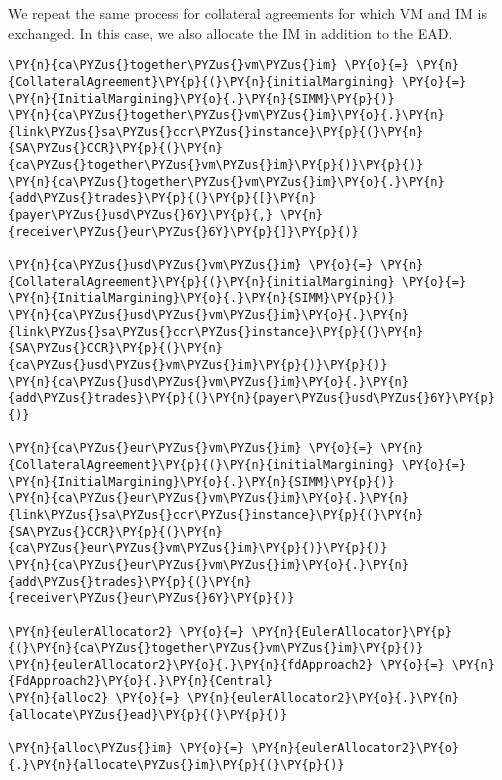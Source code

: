     We repeat the same process for collateral agreements for which VM and IM
is exchanged. In this case, we also allocate the IM in addition to the
EAD.

    \begin{tcolorbox}[breakable, size=fbox, boxrule=1pt, pad at break*=1mm,colback=cellbackground, colframe=cellborder]
\begin{Verbatim}[commandchars=\\\{\}]
\PY{n}{ca\PYZus{}together\PYZus{}vm\PYZus{}im} \PY{o}{=} \PY{n}{CollateralAgreement}\PY{p}{(}\PY{n}{initialMargining} \PY{o}{=} \PY{n}{InitialMargining}\PY{o}{.}\PY{n}{SIMM}\PY{p}{)}
\PY{n}{ca\PYZus{}together\PYZus{}vm\PYZus{}im}\PY{o}{.}\PY{n}{link\PYZus{}sa\PYZus{}ccr\PYZus{}instance}\PY{p}{(}\PY{n}{SA\PYZus{}CCR}\PY{p}{(}\PY{n}{ca\PYZus{}together\PYZus{}vm\PYZus{}im}\PY{p}{)}\PY{p}{)}
\PY{n}{ca\PYZus{}together\PYZus{}vm\PYZus{}im}\PY{o}{.}\PY{n}{add\PYZus{}trades}\PY{p}{(}\PY{p}{[}\PY{n}{payer\PYZus{}usd\PYZus{}6Y}\PY{p}{,} \PY{n}{receiver\PYZus{}eur\PYZus{}6Y}\PY{p}{]}\PY{p}{)}

\PY{n}{ca\PYZus{}usd\PYZus{}vm\PYZus{}im} \PY{o}{=} \PY{n}{CollateralAgreement}\PY{p}{(}\PY{n}{initialMargining} \PY{o}{=} \PY{n}{InitialMargining}\PY{o}{.}\PY{n}{SIMM}\PY{p}{)}
\PY{n}{ca\PYZus{}usd\PYZus{}vm\PYZus{}im}\PY{o}{.}\PY{n}{link\PYZus{}sa\PYZus{}ccr\PYZus{}instance}\PY{p}{(}\PY{n}{SA\PYZus{}CCR}\PY{p}{(}\PY{n}{ca\PYZus{}usd\PYZus{}vm\PYZus{}im}\PY{p}{)}\PY{p}{)}
\PY{n}{ca\PYZus{}usd\PYZus{}vm\PYZus{}im}\PY{o}{.}\PY{n}{add\PYZus{}trades}\PY{p}{(}\PY{n}{payer\PYZus{}usd\PYZus{}6Y}\PY{p}{)}

\PY{n}{ca\PYZus{}eur\PYZus{}vm\PYZus{}im} \PY{o}{=} \PY{n}{CollateralAgreement}\PY{p}{(}\PY{n}{initialMargining} \PY{o}{=} \PY{n}{InitialMargining}\PY{o}{.}\PY{n}{SIMM}\PY{p}{)}
\PY{n}{ca\PYZus{}eur\PYZus{}vm\PYZus{}im}\PY{o}{.}\PY{n}{link\PYZus{}sa\PYZus{}ccr\PYZus{}instance}\PY{p}{(}\PY{n}{SA\PYZus{}CCR}\PY{p}{(}\PY{n}{ca\PYZus{}eur\PYZus{}vm\PYZus{}im}\PY{p}{)}\PY{p}{)}
\PY{n}{ca\PYZus{}eur\PYZus{}vm\PYZus{}im}\PY{o}{.}\PY{n}{add\PYZus{}trades}\PY{p}{(}\PY{n}{receiver\PYZus{}eur\PYZus{}6Y}\PY{p}{)}

\PY{n}{eulerAllocator2} \PY{o}{=} \PY{n}{EulerAllocator}\PY{p}{(}\PY{n}{ca\PYZus{}together\PYZus{}vm\PYZus{}im}\PY{p}{)}
\PY{n}{eulerAllocator2}\PY{o}{.}\PY{n}{fdApproach2} \PY{o}{=} \PY{n}{FdApproach2}\PY{o}{.}\PY{n}{Central}
\PY{n}{alloc2} \PY{o}{=} \PY{n}{eulerAllocator2}\PY{o}{.}\PY{n}{allocate\PYZus{}ead}\PY{p}{(}\PY{p}{)}

\PY{n}{alloc\PYZus{}im} \PY{o}{=} \PY{n}{eulerAllocator2}\PY{o}{.}\PY{n}{allocate\PYZus{}im}\PY{p}{(}\PY{p}{)}
\end{Verbatim}
\end{tcolorbox}

